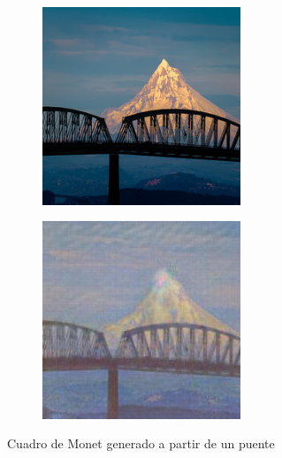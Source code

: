 \documentclass[[../main.tex]{subfiles}
\begin{document}
        \begin{figure}[!htb]
            \begin{subfigure}[b]{0.49\textwidth}
            \includegraphics[width=0.65\textwidth]{imagenes/imagen2cuadro/dataset/monet/2014-08-07 21_31_39.jpg}
            \end{subfigure}
        \hfill
            \begin{subfigure}[b]{0.49\textwidth}
            \includegraphics[width=0.65\textwidth]{imagenes/imagen2cuadro/dataset/monet/2014-08-07 21_31_39_2.jpg}
            \end{subfigure}
        \caption{Cuadro de Monet generado a partir de un puente}
        \label{fig:monet_cuadro_puente}
        \end{figure}
        
\end{document}

